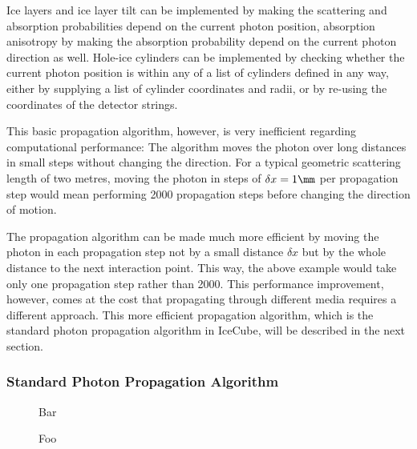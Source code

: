 Ice layers and ice layer tilt can be implemented by making the scattering and absorption probabilities depend on the current photon position, absorption anisotropy by making the absorption probability depend on the current photon direction as well. Hole-ice cylinders can be implemented by checking whether the current photon position is within any of a list of cylinders defined in any way, either by supplying a list of cylinder coordinates and radii, or by re-using the coordinates of the detector strings.

This basic propagation algorithm, however, is very inefficient regarding computational performance: The algorithm moves the photon over long distances in small steps without changing the direction. For a typical geometric scattering length of two metres, moving the photon in steps of $\delta x = 1\mm$ per propagation step would mean performing 2000 propagation steps before changing the direction of motion.

The propagation algorithm can be made much more efficient by moving the photon in each propagation step not by a small distance $\delta x$ but by the whole distance to the next interaction point. This way, the above example would take only one propagation step rather than 2000. This performance improvement, however, comes at the cost that propagating through different media requires a different approach. This more efficient propagation algorithm, which is the standard photon propagation algorithm in IceCube, will be described in the next section.

\subsubsection{Standard Photon Propagation Algorithm}

\begin{figure}[htb]
  \label{fig:oheeL3ai}
  \caption{Bar}
\end{figure}


\begin{figure}[htb]
  \label{fig:Ar0vai8u}
  \caption{Foo}
\end{figure}



